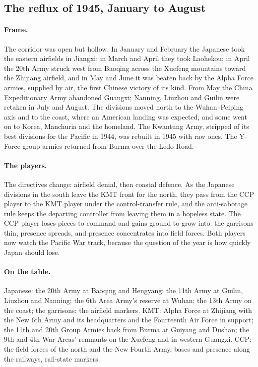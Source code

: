 \documentclass[11pt]{article}
\begin{document}
\subsection{The reflux of 1945, January to August}
\paragraph{Frame.} The corridor was open but hollow. In January and February the Japanese took the eastern airfields in Jiangxi; in March and April they took Laohekou; in April the 20th Army struck west from Baoqing across the Xuefeng mountains toward the Zhijiang airfield, and in May and June it was beaten back by the Alpha Force armies, supplied by air, the first Chinese victory of its kind. From May the China Expeditionary Army abandoned Guangxi; Nanning, Liuzhou and Guilin were retaken in July and August. The divisions moved north to the Wuhan--Peiping axis and to the coast, where an American landing was expected, and some went on to Korea, Manchuria and the homeland. The Kwantung Army, stripped of its best divisions for the Pacific in 1944, was rebuilt in 1945 with raw ones. The Y-Force group armies returned from Burma over the Ledo Road.
\paragraph{The players.} The directives change: airfield denial, then coastal defence. As the Japanese divisions in the south leave the KMT front for the north, they pass from the CCP player to the KMT player under the control-transfer rule, and the anti-sabotage rule keeps the departing controller from leaving them in a hopeless state. The CCP player loses pieces to command and gains ground to grow into: the garrisons thin, presence spreads, and presence concentrates into field forces. Both players now watch the Pacific War track, because the question of the year is how quickly Japan should lose.
\paragraph{On the table.} Japanese: the 20th Army at Baoqing and Hengyang; the 11th Army at Guilin, Liuzhou and Nanning; the 6th Area Army's reserve at Wuhan; the 13th Army on the coast; the garrisons; the airfield markers. KMT: Alpha Force at Zhijiang with the New 6th Army and its headquarters and the Fourteenth Air Force in support; the 11th and 20th Group Armies back from Burma at Guiyang and Dushan; the 9th and 4th War Areas' remnants on the Xuefeng and in western Guangxi. CCP: the field forces of the north and the New Fourth Army, bases and presence along the railways, rail-state markers.
\end{document}
